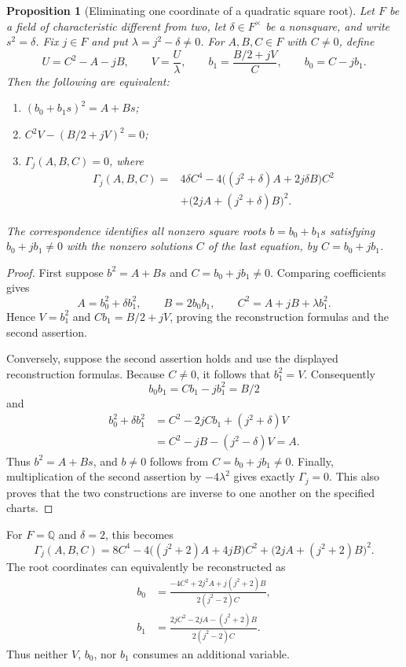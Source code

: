 \documentclass[11pt]{article}
\newtheorem{proposition}[theorem]{Proposition}
\theoremstyle{definition}
\begin{document}
\begin{proposition}[Eliminating one coordinate of a quadratic square root]
\label{prop:quadratic-square-root}
Let $F$ be a field of characteristic different from two, let
$\delta\in F^\times$ be a nonsquare, and write $s^2=\delta$.
Fix $j\in F$ and put $\lambda=j^2-\delta\ne0$.
For $A,B,C\in F$ with $C\ne0$, define
\[
 U=C^2-A-jB,\qquad V=\frac{U}{\lambda},\qquad
 b_1=\frac{B/2+jV}{C},\qquad b_0=C-jb_1.
\]
Then the following are equivalent:
\begin{enumerate}
 \item $(b_0+b_1s)^2=A+Bs$;
 \item $C^2V-(B/2+jV)^2=0$;
 \item $\Gamma_j(A,B,C)=0$, where
 \begin{align*}
 \Gamma_j(A,B,C)
 ={}&4\delta C^4
   -4\bigl((j^2+\delta)A+2j\delta B\bigr)C^2\\
   &+\bigl(2jA+(j^2+\delta)B\bigr)^2.
 \end{align*}
\end{enumerate}
The correspondence identifies all nonzero square roots
$b=b_0+b_1s$ satisfying $b_0+jb_1\ne0$ with the nonzero solutions
$C$ of the last equation, by $C=b_0+jb_1$.
\end{proposition}
\begin{proof}
First suppose $b^2=A+Bs$ and $C=b_0+jb_1\ne0$.
Comparing coefficients gives
\[
 A=b_0^2+\delta b_1^2,\qquad B=2b_0b_1,
 \qquad C^2=A+jB+\lambda b_1^2.
\]
Hence $V=b_1^2$ and $Cb_1=B/2+jV$, proving the reconstruction formulas
and the second assertion.

Conversely, suppose the second assertion holds and use the displayed
reconstruction formulas.  Because $C\ne0$, it follows that $b_1^2=V$.
Consequently
\[
 b_0b_1=Cb_1-jb_1^2=B/2
\]
and
\begin{align*}
 b_0^2+\delta b_1^2
 &=C^2-2jCb_1+(j^2+\delta)V\\
 &=C^2-jB-(j^2-\delta)V=A.
\end{align*}
Thus $b^2=A+Bs$, and $b\ne0$ follows from $C=b_0+jb_1\ne0$.
Finally, multiplication of the second assertion by $-4\lambda^2$
gives exactly $\Gamma_j=0$.  This also proves that the two
constructions are inverse to one another on the specified charts.
\end{proof}

For $F=\mathbb Q$ and $\delta=2$, this becomes
\[
 \Gamma_j(A,B,C)=
 8C^4-4\bigl((j^2+2)A+4jB\bigr)C^2
 +\bigl(2jA+(j^2+2)B\bigr)^2.
\]
The root coordinates can equivalently be reconstructed as
\begin{align*}
 b_0&=\frac{-4C^2+2j^2A+j(j^2+2)B}{2(j^2-2)C},\\
 b_1&=\frac{2jC^2-2jA-(j^2+2)B}{2(j^2-2)C}.
\end{align*}
Thus neither $V$, $b_0$, nor $b_1$ consumes an additional variable.
\end{document}

